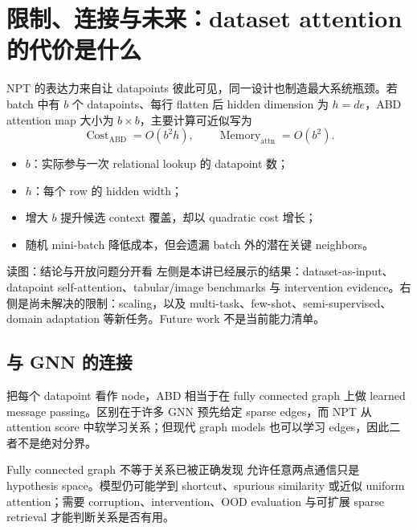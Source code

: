 \section{限制、连接与未来：dataset attention 的代价是什么}

NPT 的表达力来自让 datapoints 彼此可见，同一设计也制造最大系统瓶颈。若 batch 中有 $b$ 个 datapoints、每行 flatten 后 hidden dimension 为 $h=de$，ABD attention map 大小为 $b\times b$，主要计算可近似写为
\[
\operatorname{Cost}_{\mathrm{ABD}}=O(b^2h),
\qquad
\operatorname{Memory}_{\mathrm{attn}}=O(b^2).
\]

\begin{itemize}
  \item $b$：实际参与一次 relational lookup 的 datapoint 数；
  \item $h$：每个 row 的 hidden width；
  \item 增大 $b$ 提升候选 context 覆盖，却以 quadratic cost 增长；
  \item 随机 mini-batch 降低成本，但会遗漏 batch 外的潜在关键 neighbors。
\end{itemize}


\begin{knowledgebox}{读图：结论与开放问题分开看}
左侧是本讲已经展示的结果：dataset-as-input、datapoint self-attention、tabular/image benchmarks 与 intervention evidence。右侧是尚未解决的限制：scaling，以及 multi-task、few-shot、semi-supervised、domain adaptation 等新任务。Future work 不是当前能力清单。
\end{knowledgebox}

\subsection{与 GNN 的连接}

把每个 datapoint 看作 node，ABD 相当于在 fully connected graph 上做 learned message passing。区别在于许多 GNN 预先给定 sparse edges，而 NPT 从 attention score 中软学习关系；但现代 graph models 也可以学习 edges，因此二者不是绝对分界。


\begin{warningbox}{Fully connected graph 不等于关系已被正确发现}
允许任意两点通信只是 hypothesis space。模型仍可能学到 shortcut、spurious similarity 或近似 uniform attention；需要 corruption、intervention、OOD evaluation 与可扩展 sparse retrieval 才能判断关系是否有用。
\end{warningbox}

